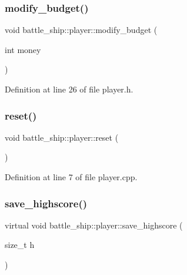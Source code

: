 \subsubsection{\texorpdfstring{modify\+\_\+budget()}{modify\_budget()}}
{\footnotesize\ttfamily void battle\+\_\+ship\+::player\+::modify\+\_\+budget (\begin{DoxyParamCaption}\item[{int}]{money }\end{DoxyParamCaption})\hspace{0.3cm}{\ttfamily [inline]}}



Definition at line 26 of file player.\+h.

\mbox{\label{classbattle__ship_1_1player_ae21fefa953f6a3a0476cabfae7084bbf}} 
\subsubsection{\texorpdfstring{reset()}{reset()}}
{\footnotesize\ttfamily void battle\+\_\+ship\+::player\+::reset (\begin{DoxyParamCaption}{ }\end{DoxyParamCaption})}



Definition at line 7 of file player.\+cpp.

\mbox{\label{classbattle__ship_1_1player_a928538249678aea5402f8c673671e995}} 
\subsubsection{\texorpdfstring{save\+\_\+highscore()}{save\_highscore()}}
{\footnotesize\ttfamily virtual void battle\+\_\+ship\+::player\+::save\+\_\+highscore (\begin{DoxyParamCaption}\item[{size\+\_\+t}]{h }\end{DoxyParamCaption})\hspace{0.3cm}{\ttfamily [pure virtual]}}



